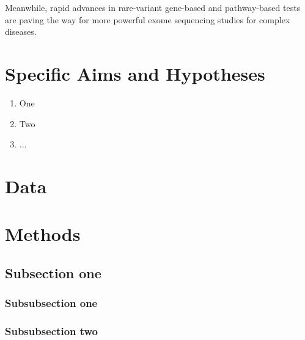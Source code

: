 \documentclass[12pt]{article}
\begin{document}
Meanwhile, rapid advances in rare-variant
gene-based and pathway-based tests are paving the
way for more powerful exome sequencing studies for
complex diseases.

\newpage
\section{Specific Aims and Hypotheses}\label{sec:aims}

\begin{enumerate}
\item One

\item Two

\item ...
\end{enumerate}

\newpage
\section{Data}\label{sec:data}

\newpage
\section{Methods}\label{sec:method}


\subsection{Subsection one}\label{sec:subsec1}


\subsubsection{Subsubsection one}\label{sec:subsub1-1}

\subsubsection{Subsubsection two}\label{sec:subsub1-2}
\end{document}
